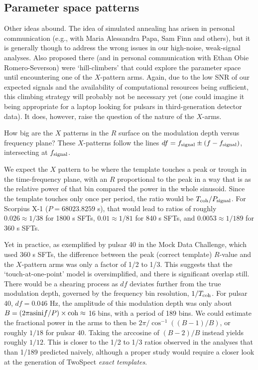 \subsection{Parameter space patterns}
Other ideas abound. The idea of simulated annealing has arisen in personal communication (e.g., with Maria Alessandra Papa, Sam Finn and others), but it is generally though to address the wrong issues in our high-noise, weak-signal analyses. Also proposed there (and in personal communication with Ethan Obie Romero-Severson) were `hill-climbers' that could explore the parameter space until encountering one of the $X$-pattern arms. Again, due to the low SNR of our expected signals and the availability of computational resources being sufficient, this climbing strategy will probably not be necessary yet (one could imagine it being appropriate for a laptop looking for pulsars in third-generation detector data). It does, however, raise the question of the nature of the $X$-arms.

            How big are the $X$ patterns in the $R$ surface on the modulation depth versus frequency plane?
These $X$-patterns follow the lines $df = f_{\textup{signal}} \pm (f - f_\textup{signal})$, intersecting at $f_\textup{signal}$.

We expect the $X$ pattern to be where the template touches a peak or trough in the time-frequency plane, with an $R$ proportional to the peak in a way that is as the relative power of that bin compared the power in the whole sinusoid. 
Since the template touches only once per period, the ratio would be $T_{\textup{coh}} / P_{\textup{signal}}$. For Scorpius X-1 ($P = 68023.8259$ s), that would lead to ratios of roughly $0.026 \approx 1/38$ for 1800 s SFTs, $0.01 \approx 1/81$ for 840 s SFTs, and $0.0053 \approx 1/189$ for 360 s SFTs.

Yet in practice, as exemplified by pulsar 40 in the Mock Data Challenge, which used 360 s SFTs, the difference between the peak (correct template) $R$-value and the $X$-pattern arms was only a factor of 1/2 to 1/3.
This suggests that the `touch-at-one-point' model is oversimplified, and there is significant overlap still.
There would be a shearing process as $df$ deviates further from the true modulation depth, governed by the frequency bin resolution, $1/T_\textup{coh}$. 
For pulsar 40, $df = 0.046$ Hz, the amplitude of this modulation depth was only about $B = \left(2 \pi \textup{asini} f / P \right) \times \textup{coh} \approx $ 16 bins, with a period of 189 bins.
We could estimate the fractional power in the arms to then be $2 \pi / \cos^{-1} ((B-1) / B)$, or roughly $1/18$ for pulsar 40.
Taking the arccosine of $(B-2)/B$ instead yields roughly $1/12$.
This is closer to the 1/2 to 1/3 ratios observed in the analyses that than 1/189 predicted naively, although a proper study would require a closer look at the generation of TwoSpect \textit{exact templates}.


